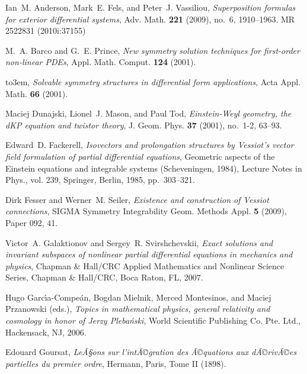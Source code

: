 \documentclass[a4paper, 11pt]{amsart}
\theoremstyle{definition}
\begin{document}
\providecommand{\bysame}{\leavevmode\hbox to3em{\hrulefill}\thinspace}
\providecommand{\MR}{\relax\ifhmode\unskip\space\fi MR }
\providecommand{\MRhref}[2]{  \href{http://www.ams.org/mathscinet-getitem?mr=#1}{#2}
}
\providecommand{\href}[2]{#2}
\begin{thebibliography}{10}

Ian~M. Anderson, Mark~E. Fels, and Peter~J. Vassiliou, \emph{Superposition
  formulas for exterior differential systems}, Adv. Math. \textbf{221} (2009),
  no.~6, 1910--1963. \MR{2522831 (2010i:37155)}

M.~A. Barco and G.~E. Prince, \emph{New symmetry solution techniques for
  first-order non-linear {PDE}s}, Appl. Math. Comput. \textbf{124} (2001).

\bysame, \emph{Solvable symmetry structures in differential form applications},
  Acta Appl. Math. \textbf{66} (2001).

Maciej Dunajski, Lionel~J. Mason, and Paul Tod, \emph{Einstein-{W}eyl geometry,
  the d{KP} equation and twistor theory}, J. Geom. Phys. \textbf{37} (2001),
  no.~1-2, 63--93.

Edward~D. Fackerell, \emph{Isovectors and prolongation structures by
  {V}essiot's vector field formulation of partial differential equations},
  Geometric aspects of the {E}instein equations and integrable systems
  ({S}cheveningen, 1984), Lecture Notes in Phys., vol. 239, Springer, Berlin,
  1985, pp.~303--321.

Dirk Fesser and Werner~M. Seiler, \emph{Existence and construction of {V}essiot
  connections}, SIGMA Symmetry Integrability Geom. Methods Appl. \textbf{5}
  (2009), Paper 092, 41.

Victor~A. Galaktionov and Sergey~R. Svirshchevskii, \emph{Exact solutions and
  invariant subspaces of nonlinear partial differential equations in mechanics
  and physics}, Chapman \& Hall/CRC Applied Mathematics and Nonlinear Science
  Series, Chapman \& Hall/CRC, Boca Raton, FL, 2007.

Hugo Garc{\'{\i}}a-Compe{\'a}n, Bogdan Mielnik, Merced Montesinos, and Maciej
  Przanowski (eds.), \emph{Topics in mathematical physics, general relativity
  and cosmology in honor of {J}erzy {P}leba\'nski}, World Scientific Publishing
  Co. Pte. Ltd., Hackensack, NJ, 2006.

Edouard Goursat, \emph{LeÃ§ons sur l'intÃ©gration des Ã©quations aux dÃ©rivÃ©es
  partielles du premier ordre}, Hermann, Paris, Tome II (1898).


\end{thebibliography}
\end{document}

